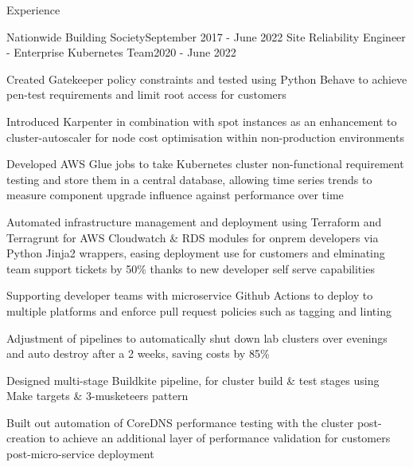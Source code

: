 \documentclass{resume} %
\begin{document}
\begin{rSection}{Experience}
\begin{rSubsection}{Nationwide Building Society}{September 2017 - June 2022}
\normalfont
{Site Reliability Engineer - Enterprise Kubernetes Team}{2020 - June 2022}
\normalfont
\item Created Gatekeeper policy constraints and tested using Python Behave to achieve pen-test requirements and limit root access for customers %
\item Introduced Karpenter in combination with spot instances as an enhancement to cluster-autoscaler for node cost optimisation within non-production environments %
\item Developed AWS Glue jobs to take Kubernetes cluster non-functional requirement testing and store them in a central database, allowing time series trends to measure component upgrade influence against performance over time %
\item Automated infrastructure management and deployment using Terraform and Terragrunt for AWS Cloudwatch \& RDS modules for onprem developers via Python Jinja2 wrappers, easing deployment use for customers and elminating team support tickets by 50\% thanks to new developer self serve capabilities %
\item Supporting developer teams with microservice Github Actions to deploy to multiple platforms and enforce pull request policies such as tagging and linting %
\item Adjustment of pipelines to automatically shut down lab clusters over evenings and auto destroy after a 2 weeks, saving costs by 85\% %
\item Designed multi-stage Buildkite pipeline, for cluster build \& test stages using Make targets \& 3-musketeers pattern %
\item Built out automation of CoreDNS performance testing with the cluster post-creation to achieve an additional layer of performance validation for customers post-micro-service deployment %
\end{rSubsection}


\end{rSection}
\end{document}
